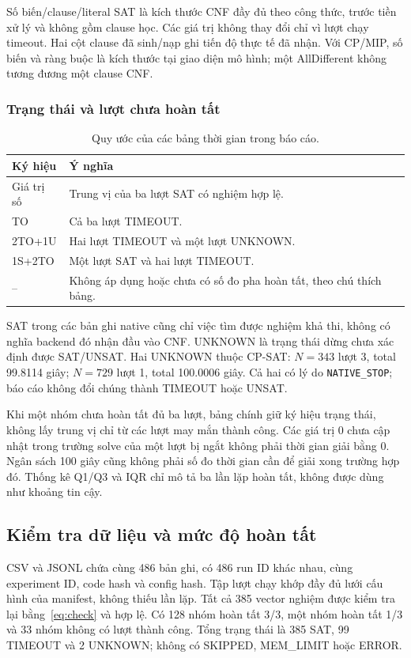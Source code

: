 Số biến/clause/literal SAT là kích thước CNF đầy đủ theo công thức, trước tiền xử lý và không gồm clause học. Các giá trị không thay đổi chỉ vì lượt chạy timeout. Hai cột clause đã sinh/nạp ghi tiến độ thực tế đã nhận. Với CP/MIP, số biến và ràng buộc là kích thước tại giao diện mô hình; một AllDifferent không tương đương một clause CNF.

\subsubsection{Trạng thái và lượt chưa hoàn tất}
\begin{table}[pos=H]\centering\small
\caption{Quy ước của các bảng thời gian trong báo cáo.}
\begin{tabular}{@{}lp{.73\linewidth}@{}}\toprule
Ký hiệu & Ý nghĩa\\\midrule
Giá trị số & Trung vị của ba lượt SAT có nghiệm hợp lệ.\\
TO & Cả ba lượt TIMEOUT.\\
2TO+1U & Hai lượt TIMEOUT và một lượt UNKNOWN.\\
1S+2TO & Một lượt SAT và hai lượt TIMEOUT.\\
-- & Không áp dụng hoặc chưa có số đo pha hoàn tất, theo chú thích bảng.\\
\bottomrule\end{tabular}
\end{table}
SAT trong các bản ghi native cũng chỉ việc tìm được nghiệm khả thi, không có nghĩa backend đó nhận đầu vào CNF. UNKNOWN là trạng thái dừng chưa xác định được SAT/UNSAT. Hai UNKNOWN thuộc CP-SAT: $N=343$ lượt 3, total 99.8114 giây; $N=729$ lượt 1, total 100.0006 giây. Cả hai có lý do \texttt{NATIVE\_STOP}; báo cáo không đổi chúng thành TIMEOUT hoặc UNSAT.

Khi một nhóm chưa hoàn tất đủ ba lượt, bảng chính giữ ký hiệu trạng thái, không lấy trung vị chỉ từ các lượt may mắn thành công. Các giá trị 0 chưa cập nhật trong trường solve của một lượt bị ngắt không phải thời gian giải bằng 0. Ngân sách 100 giây cũng không phải số đo thời gian cần để giải xong trường hợp đó. Thống kê Q1/Q3 và IQR chỉ mô tả ba lần lặp hoàn tất, không được dùng như khoảng tin cậy.

\subsection{Kiểm tra dữ liệu và mức độ hoàn tất}
CSV và JSONL chứa cùng 486 bản ghi, có 486 run ID khác nhau, cùng experiment ID, code hash và config hash. Tập lượt chạy khớp đầy đủ lưới cấu hình của manifest, không thiếu lần lặp. Tất cả 385 vector nghiệm được kiểm tra lại bằng~\eqref{eq:check} và hợp lệ. Có 128 nhóm hoàn tất 3/3, một nhóm hoàn tất 1/3 và 33 nhóm không có lượt thành công. Tổng trạng thái là 385 SAT, 99 TIMEOUT và 2 UNKNOWN; không có SKIPPED, MEM\_LIMIT hoặc ERROR.

